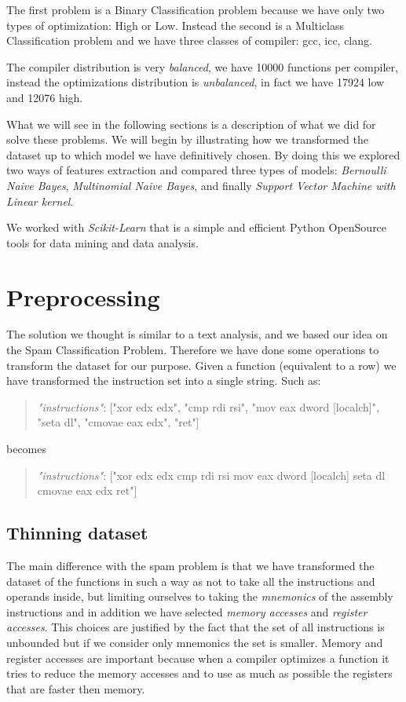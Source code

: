 \documentclass[12pt]{article}
\begin{document}
The first problem is a Binary Classification problem because we have only two types of optimization: High or Low.
Instead the second is a Multiclass Classification problem and we have three classes of compiler: gcc, icc, clang.

The compiler distribution is very {\em balanced}, we have 10000 functions per compiler, instead the optimizations distribution
is {\em unbalanced}, in fact we have 17924 low and 12076 high.

What we will see in the following sections is a description of what we did for solve these problems.
We will begin by illustrating how we transformed the dataset up to which model we have definitively chosen. By doing this we explored two ways of features extraction and compared three types of models:
{\em Bernoulli Naive Bayes},
{\em Multinomial Naive Bayes},
and finally {\em Support Vector Machine with Linear kernel}.

We worked with {\em Scikit-Learn} that is a simple and efficient Python OpenSource tools for data mining and data analysis.

\section{Preprocessing}
The solution we thought is similar to a text analysis, and we based our idea on the Spam Classification Problem.
Therefore we have done some operations to transform the dataset for our purpose. Given a function (equivalent to a row) we have transformed the instruction set into a single string. Such as:
\begin{quote}
{\em "instructions"}: ["xor edx edx", "cmp rdi rsi", "mov eax dword [localch]", "seta dl", "cmovae eax edx", "ret"]
\end{quote}
\centerline{becomes}
\begin{quote}
{\em "instructions"}: ["xor edx edx cmp rdi rsi mov eax dword [localch] seta dl cmovae eax edx ret"]
\end{quote}


\subsection{Thinning dataset}
The main difference with the spam problem is that we have transformed the dataset of the functions in such a way as not to take all the instructions and operands inside, but limiting ourselves to taking the {\em mnemonics} of the assembly instructions and in addition we have selected {\em memory accesses} and {\em register accesses}. This choices are justified by the fact that the set of all instructions is unbounded but if we consider only mnemonics the set is smaller. Memory and register accesses are important because when a compiler optimizes a function it tries to reduce the memory accesses and to use as much as possible the registers that are faster then memory.
\end{document}
